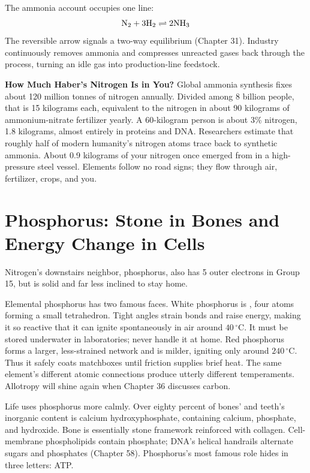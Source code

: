 The ammonia account occupies one line:
\[\mathrm{N_2} + \mathrm{3H_2} \rightleftharpoons \mathrm{2NH_3}\]
The reversible arrow signals a two-way equilibrium (Chapter 31). Industry continuously removes ammonia and compresses unreacted gases back through the process, turning an idle gas into production-line feedstock.

\begin{qiaoliang}
\textbf{How Much Haber's Nitrogen Is in You?} Global ammonia synthesis fixes about 120 million tonnes of nitrogen annually. Divided among 8 billion people, that is 15 kilograms each, equivalent to the nitrogen in about 90 kilograms of ammonium-nitrate fertilizer yearly. A 60-kilogram person is about 3\% nitrogen, 1.8 kilograms, almost entirely in proteins and DNA. Researchers estimate that roughly half of modern humanity's nitrogen atoms trace back to synthetic ammonia. About 0.9 kilograms of your nitrogen once emerged from  in a high-pressure steel vessel. Elements follow no road signs; they flow through air, fertilizer, crops, and you.
\end{qiaoliang}

\section{Phosphorus: Stone in Bones and Energy Change in Cells}

Nitrogen's downstairs neighbor, phosphorus, also has 5 outer electrons in Group 15, but is solid and far less inclined to stay home.

Elemental phosphorus has two famous faces. White phosphorus is , four atoms forming a small tetrahedron. Tight angles strain bonds and raise energy, making it so reactive that it can ignite spontaneously in air around $40\,^{\circ}\mathrm{C}$. It must be stored underwater in laboratories; never handle it at home. Red phosphorus forms a larger, less-strained network and is milder, igniting only around $240\,^{\circ}\mathrm{C}$. Thus it safely coats matchboxes until friction supplies brief heat. The same element's different atomic connections produce utterly different temperaments. Allotropy will shine again when Chapter 36 discusses carbon.

Life uses phosphorus more calmly. Over eighty percent of bones' and teeth's inorganic content is calcium hydroxyphosphate, containing calcium, phosphate, and hydroxide. Bone is essentially stone framework reinforced with collagen. Cell-membrane phospholipids contain phosphate; DNA's helical handrails alternate sugars and phosphates (Chapter 58). Phosphorus's most famous role hides in three letters: ATP.

